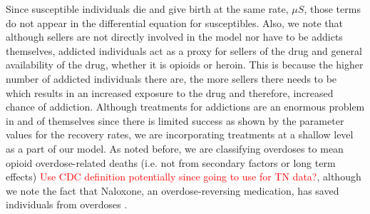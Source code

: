 \documentclass[12pt]{article}
\begin{document}
Since susceptible individuals die and give birth at the same rate, $\mu S$, those terms do not appear in the differential equation for susceptibles. Also, we note that although sellers are not directly involved in the model nor have to be addicts themselves, addicted individuals act as a proxy for sellers of the drug and general availability of the drug, whether it is opioids or heroin. This is because the higher number of addicted individuals there are, the more sellers there needs to be which results in an increased exposure to the drug and therefore, increased chance of addiction. Although treatments for addictions are an enormous problem in and of themselves since there is limited success as shown by the parameter values for the recovery rates, we are incorporating treatments at a shallow level as a part of our model. As noted before, we are classifying overdoses to mean opioid overdose-related deaths (i.e. not from secondary factors or long term effects) \textcolor{red}{Use CDC definition potentially since going to use for TN data?},
although we note the fact that Naloxone, an overdose-reversing medication, has saved individuals from overdoses \cite{NIDA2}. 
\end{document}
